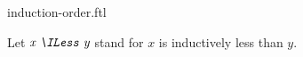 \documentclass{stex}
\begin{document}
\begin{smodule}{induction-order.ftl}


\begin{fakeforthel}
  \begin{convention}[for=ILess]
    Let $\emph{x \ILess y}$ stand for $x$ is inductively less than $y$.
  \end{convention}
\end{fakeforthel}

\end{smodule}
\end{document}
